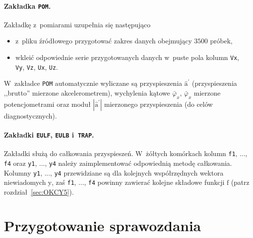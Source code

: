 \documentclass[paper=a4,DIV=12]{tmmlab}
\newcommand{\brm}[1]{\bm{\mathrm{#1}}}
\begin{document}
\paragraph{Zakładka \texttt{POM}.} Zakładkę z~pomiarami uzupełnia się
następująco
\begin{itemize}
  \item z~pliku źródłowego przygotować zakres danych obejmujący $3500$ próbek,
  \item wkleić odpowiednie serie przygotowanych danych w~puste pola kolumn
    \texttt{Vx}, \texttt{Vy}, \texttt{Vz}, \texttt{Ux}, \texttt{Uz}.
\end{itemize}
W~zakładce \texttt{POM} automatycznie wyliczane są przyspieszenia
$\hat{\brm{a}}^{\prime}$ (przyspieszenia ,,brutto'' mierzone akcelerometrem),
wychylenia kątowe $\bar{\varphi}_x$, $\bar{\varphi}_x$ mierzone potencjometrami
oraz moduł $\left|\hat{\brm{a}}^{\prime}\right|$ mierzonego przyspieszenia
(do celów diagnostycznych).

\paragraph{Zakładki \texttt{EULF}, \texttt{EULB} i~\texttt{TRAP}.} Zakładki
służą do całkowania przyspieszeń. W~żółtych komórkach kolumn \texttt{f1}, ...,
\texttt{f4} oraz \texttt{y1}, ..., \texttt{y4} należy zaimplementować
odpowiednią metodę całkowania. Kolumny \texttt{y1}, ..., \texttt{y4}
przewidziane są dla kolejnych współrzędnych wektora niewiadomych $\brm{y}$, zaś
\texttt{f1}, ..., \texttt{f4} powinny zawierać kolejne składowe funkcji
$\brm{f}$ (patrz rozdział~\ref{sec:OKCY5}).

\section{Przygotowanie sprawozdania}
\label{sec:GO0AP}
\end{document}
